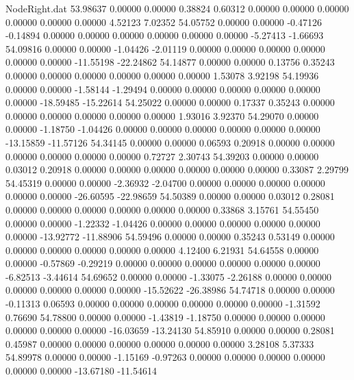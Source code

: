 \begin{filecontents}{NodeRight.dat}
  53.98637    0.00000    0.00000     0.38824    0.60312    0.00000    0.00000    0.00000    0.00000    0.00000    0.00000    4.52123    7.02352
  54.05752    0.00000    0.00000    -0.47126   -0.14894    0.00000    0.00000    0.00000    0.00000    0.00000    0.00000   -5.27413   -1.66693
  54.09816    0.00000    0.00000    -1.04426   -2.01119    0.00000    0.00000    0.00000    0.00000    0.00000    0.00000  -11.55198  -22.24862
  54.14877    0.00000    0.00000     0.13756    0.35243    0.00000    0.00000    0.00000    0.00000    0.00000    0.00000    1.53078    3.92198
  54.19936    0.00000    0.00000    -1.58144   -1.29494    0.00000    0.00000    0.00000    0.00000    0.00000    0.00000  -18.59485  -15.22614
  54.25022    0.00000    0.00000     0.17337    0.35243    0.00000    0.00000    0.00000    0.00000    0.00000    0.00000    1.93016    3.92370
  54.29070    0.00000    0.00000    -1.18750   -1.04426    0.00000    0.00000    0.00000    0.00000    0.00000    0.00000  -13.15859  -11.57126
  54.34145    0.00000    0.00000     0.06593    0.20918    0.00000    0.00000    0.00000    0.00000    0.00000    0.00000    0.72727    2.30743
  54.39203    0.00000    0.00000     0.03012    0.20918    0.00000    0.00000    0.00000    0.00000    0.00000    0.00000    0.33087    2.29799
  54.45319    0.00000    0.00000    -2.36932   -2.04700    0.00000    0.00000    0.00000    0.00000    0.00000    0.00000  -26.60595  -22.98659
  54.50389    0.00000    0.00000     0.03012    0.28081    0.00000    0.00000    0.00000    0.00000    0.00000    0.00000    0.33868    3.15761
  54.55450    0.00000    0.00000    -1.22332   -1.04426    0.00000    0.00000    0.00000    0.00000    0.00000    0.00000  -13.92772  -11.88906
  54.59496    0.00000    0.00000     0.35243    0.53149    0.00000    0.00000    0.00000    0.00000    0.00000    0.00000    4.12400    6.21931
  54.64558    0.00000    0.00000    -0.57869   -0.29219    0.00000    0.00000    0.00000    0.00000    0.00000    0.00000   -6.82513   -3.44614
  54.69652    0.00000    0.00000    -1.33075   -2.26188    0.00000    0.00000    0.00000    0.00000    0.00000    0.00000  -15.52622  -26.38986
  54.74718    0.00000    0.00000    -0.11313    0.06593    0.00000    0.00000    0.00000    0.00000    0.00000    0.00000   -1.31592    0.76690
  54.78800    0.00000    0.00000    -1.43819   -1.18750    0.00000    0.00000    0.00000    0.00000    0.00000    0.00000  -16.03659  -13.24130
  54.85910    0.00000    0.00000     0.28081    0.45987    0.00000    0.00000    0.00000    0.00000    0.00000    0.00000    3.28108    5.37333
  54.89978    0.00000    0.00000    -1.15169   -0.97263    0.00000    0.00000    0.00000    0.00000    0.00000    0.00000  -13.67180  -11.54614

\end{filecontents}
